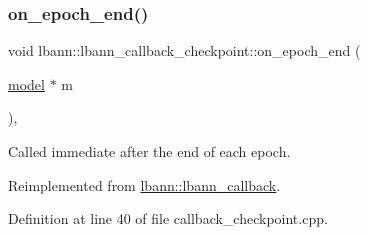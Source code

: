 \mbox{\label{classlbann_1_1lbann__callback__checkpoint_a406bfba673e503e94ae6eb57aff6a78e}} 
\subsubsection{\texorpdfstring{on\+\_\+epoch\+\_\+end()}{on\_epoch\_end()}}
{\footnotesize\ttfamily void lbann\+::lbann\+\_\+callback\+\_\+checkpoint\+::on\+\_\+epoch\+\_\+end (\begin{DoxyParamCaption}\item[{\hyperlink{classlbann_1_1model}{model} $\ast$}]{m }\end{DoxyParamCaption})\hspace{0.3cm}{\ttfamily [override]}, {\ttfamily [virtual]}}

Called immediate after the end of each epoch. 

Reimplemented from \hyperlink{classlbann_1_1lbann__callback_a1fc71110e7f754bf73c9e0f344a448a5}{lbann\+::lbann\+\_\+callback}.



Definition at line 40 of file callback\+\_\+checkpoint.\+cpp.



